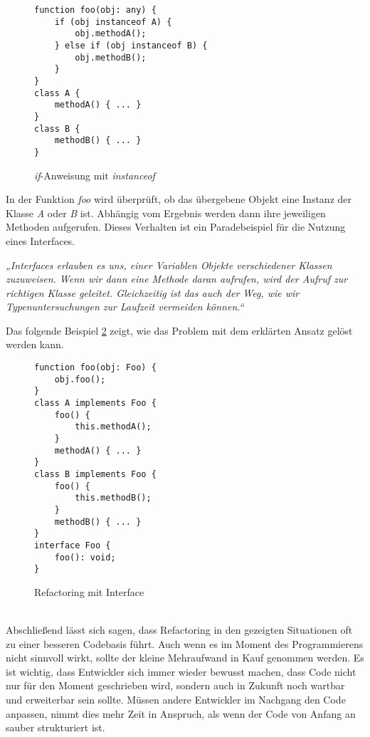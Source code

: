 \begin{figure}[ht]
    \centering
        \begin{verbatim}
function foo(obj: any) {
    if (obj instanceof A) {
        obj.methodA();
    } else if (obj instanceof B) {
        obj.methodB();
    }
}
class A {
    methodA() { ... }
}
class B {
    methodB() { ... }
}
        \end{verbatim}
    \caption{\textit{if}-Anweisung mit \textit{instanceof} \citep[S. 331]{fiveLines.2023}}
    \label{fig:LaufzeitSchlecht}
\end{figure}
In der Funktion \textit{foo} wird überprüft, ob das übergebene Objekt eine Instanz der Klasse \textit{A} oder \textit{B} ist.
Abhängig vom Ergebnis werden dann ihre jeweiligen Methoden aufgerufen.
Dieses Verhalten ist ein Paradebeispiel für die Nutzung eines Interfaces.\\
\begin{singlespace}
\textit{„Interfaces erlauben es uns, einer Variablen Objekte verschiedener Klassen zuzuweisen. Wenn wir dann eine Methode daran aufrufen, wird der Aufruf zur richtigen Klasse geleitet. Gleichzeitig ist das auch der Weg, wie wir Typenuntersuchungen zur Laufzeit vermeiden können.“} \citep[S. 332]{fiveLines.2023}\\
\end{singlespace}
\newpage
Das folgende Beispiel \ref{fig:LaufzeitGut} zeigt, wie das Problem mit dem erklärten Ansatz gelöst werden kann.
\begin{figure}[ht]
    \centering
        \begin{verbatim}
function foo(obj: Foo) {
    obj.foo();
}
class A implements Foo {
    foo() {
        this.methodA();
    }
    methodA() { ... }
}
class B implements Foo {
    foo() {
        this.methodB();
    }
    methodB() { ... }
}
interface Foo {
    foo(): void;
}
        \end{verbatim}
    \caption{Refactoring mit Interface \citep[S. 332 f.]{fiveLines.2023}}
    \label{fig:LaufzeitGut}
\end{figure}\\
Abschließend lässt sich sagen, dass Refactoring in den gezeigten Situationen oft zu einer besseren Codebasis führt. Auch wenn es im Moment des Programmierens nicht sinnvoll wirkt, sollte der kleine Mehraufwand in Kauf genommen werden.
Es ist wichtig, dass Entwickler sich immer wieder bewusst machen, dass Code nicht nur für den Moment geschrieben wird, sondern auch in Zukunft noch wartbar und erweiterbar sein sollte.
Müssen andere Entwickler im Nachgang den Code anpassen, nimmt dies mehr Zeit in Anspruch, als wenn der Code von Anfang an sauber strukturiert ist.
